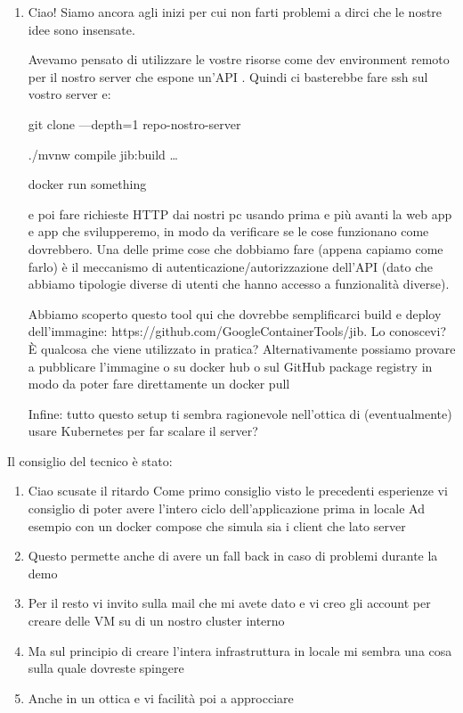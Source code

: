 \documentclass{article}
\begin{document}
\begin{enumerate}
  \item Ciao! Siamo ancora agli inizi per cui non farti problemi a dirci che le nostre idee sono insensate.

  Avevamo pensato di utilizzare le vostre risorse come dev environment remoto per il nostro server  che espone un'API . Quindi ci basterebbe fare ssh sul vostro server e:

  git clone —depth=1 repo-nostro-server

  ./mvnw compile jib:build \ldots %

  docker run something

  e poi fare richieste HTTP dai nostri pc usando prima  e più avanti la web app e app che svilupperemo, in modo da verificare se le cose funzionano come dovrebbero.
  Una delle prime cose che dobbiamo fare (appena capiamo come farlo) è il meccanismo di autenticazione/autorizzazione dell'API (dato che abbiamo tipologie diverse di utenti che hanno accesso a funzionalità diverse).

  Abbiamo scoperto questo tool qui che dovrebbe semplificarci build e deploy dell'immagine: https://github.com/GoogleContainerTools/jib. Lo conoscevi? È qualcosa che viene utilizzato in pratica?  %
  Alternativamente possiamo provare a pubblicare l'immagine o su docker hub o sul GitHub package registry in modo da poter fare direttamente un docker pull

  Infine: tutto questo setup ti sembra ragionevole nell'ottica di (eventualmente) usare Kubernetes per far scalare il server?
\end{enumerate}

Il consiglio del tecnico è stato:

\begin{enumerate}
  \item Ciao scusate il ritardo
  Come primo consiglio visto le precedenti esperienze vi consiglio di poter avere l'intero ciclo dell'applicazione prima in locale
  Ad esempio con un docker compose che simula sia i client che lato server
  \item Questo permette anche di avere un fall back in caso di problemi durante la demo
  \item Per il resto vi invito sulla mail che mi avete dato e vi creo gli account per creare delle VM su di un nostro cluster interno
  \item Ma sul principio di creare l'intera infrastruttura in locale mi sembra una cosa sulla quale dovreste spingere
  \item Anche in un ottica  e vi facilità poi a approcciare 
\end{enumerate}
\end{document}
